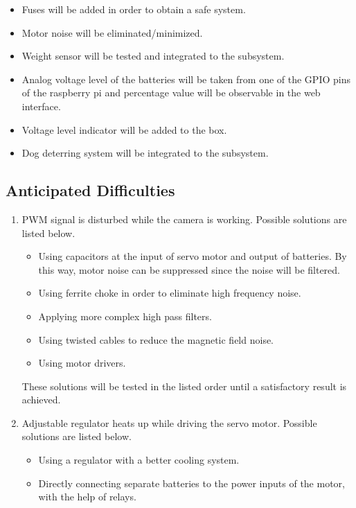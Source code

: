 \begin{itemize}
\item Fuses will be added in order to obtain a safe system.
\item Motor noise will be eliminated/minimized.
\item Weight sensor will be tested and integrated to the subsystem.
\item Analog voltage level of the batteries will be taken from one of the GPIO pins of the raspberry pi and percentage value will be observable in the web interface.
\item Voltage level indicator will be added to the box. 
\item Dog deterring system will be integrated to the subsystem.
\end{itemize}



\subsection{Anticipated Difficulties}
\begin{enumerate}
\item PWM signal is disturbed while the camera is working. Possible solutions are listed below.
\begin{itemize}
\item Using capacitors at the input of servo motor and output of batteries. By this way, motor noise can be suppressed since the noise will be filtered. \cite{cite:polulu}

\item Using ferrite choke in order to eliminate high frequency noise. \cite{cite:analog}
\item Applying more complex high pass filters.
\item Using twisted cables  to reduce the magnetic field noise. \cite{cite:robotshop}
\item Using motor drivers.
\end{itemize}
These solutions will be tested in the listed order until a satisfactory result is achieved.
\item Adjustable regulator heats up while driving the servo motor. Possible solutions are listed below.
\begin{itemize}
\item Using a regulator with a better cooling system.
\item Directly connecting separate batteries to the power inputs of the motor, with the help of relays.
\end{itemize}

\end{enumerate}

